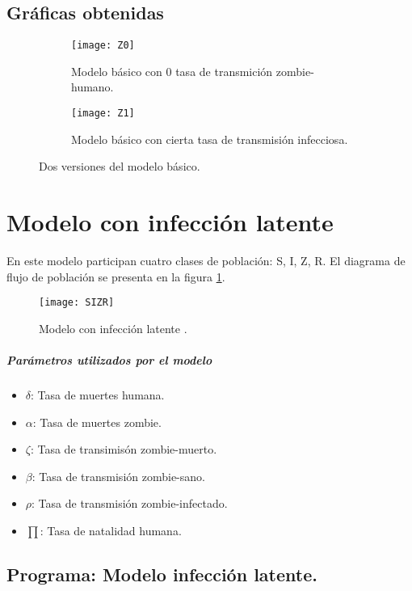 \documentclass[12pt]{article}
\begin{document}
\subsection*{Gráficas obtenidas}

\begin{figure}[H]
    \centering
    \begin{subfigure}[b]{\textwidth}
    \centering
        \texttt{[image: Z0]}
        \caption{Modelo básico con 0 tasa de transmición zombie-humano.}
    \end{subfigure}
    \begin{subfigure}[b]{\textwidth}
    \centering
        \texttt{[image: Z1]}
        \caption{Modelo básico con cierta tasa de transmisión infecciosa.}
    \end{subfigure}
    \caption{Dos versiones del modelo básico.}
\end{figure}

\section{Modelo con infección latente}
En este modelo participan cuatro clases de población: S, I, Z, R. El diagrama de flujo de población se presenta en la figura \ref{SIZR}.

\begin{figure}[H]
\centering
 \texttt{[image: SIZR]}
 \caption{Modelo con infección latente \cite{Z}.}
 \label{SIZR}
\end{figure}

\subparagraph*{Parámetros utilizados por el modelo}
\begin{itemize}
\item $\delta$: Tasa de muertes humana.
\item $\alpha$: Tasa de muertes zombie.
\item $\zeta$: Tasa de transimisón zombie-muerto.
\item $\beta$: Tasa de transmisión zombie-sano.
\item $\rho$: Tasa de transmisión zombie-infectado.
\item $\prod$: Tasa de natalidad humana.
\end{itemize}

\subsection*{Programa: Modelo infección latente.}
\end{document}

